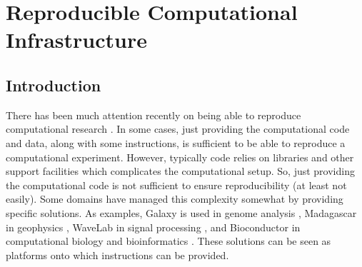 

%

\chapter{Reproducible Computational Infrastructure}


\section{Introduction}


There has been much attention recently on being able to reproduce computational research \cite{Stodden2013}. 
%
In some cases, just providing the computational code and data, along with some instructions, is sufficient to be able to reproduce a computational experiment.
%
However, typically code relies on libraries and other support facilities which complicates the computational setup.
%
So, just providing the computational code is not sufficient to ensure reproducibility (at least not easily).
%
Some domains have managed this complexity somewhat by providing specific solutions.
%
As examples, \textsf{Galaxy} is used in genome analysis \cite{Giardine2005},
%
\textsf{Madagascar} in geophysics \cite{Fomel2013},
%
\textsf{WaveLab} in signal processing \cite{Buckheit1995},
%
and \textsf{Bioconductor} in computational biology and bioinformatics \cite{Gentleman2004}.
%
These solutions can be seen as platforms onto which instructions can be provided.


